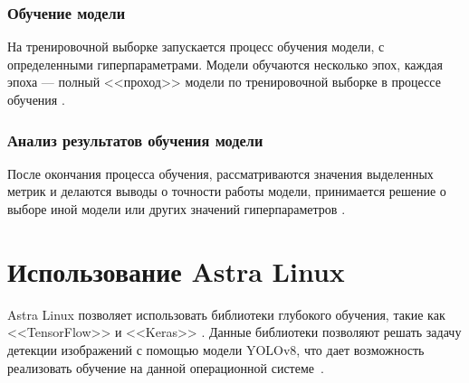 \subsubsection{Обучение модели}
На тренировочной выборке запускается процесс обучения модели, с определенными гиперпараметрами. Модели обучаются несколько эпох, каждая эпоха --- полный 
<<проход>> модели по тренировочной выборке в процессе обучения \cite{epoch}.

\subsubsection{Анализ результатов обучения модели}
После окончания процесса обучения, рассматриваются значения  выделенных метрик и делаются выводы  о точности работы модели, принимается
решение о выборе иной модели или других значений гиперпараметров \cite{learning}.

\section{Использование Astra Linux}
Astra Linux позволяет использовать библиотеки глубокого обучения, такие как <<TensorFlow>> и <<Keras>> \cite{astra_linux}. Данные библиотеки позволяют
решать задачу детекции изображений с помощью модели YOLOv8, что дает возможность реализовать обучение на данной операционной системе~\cite{keras_yolov8}.











